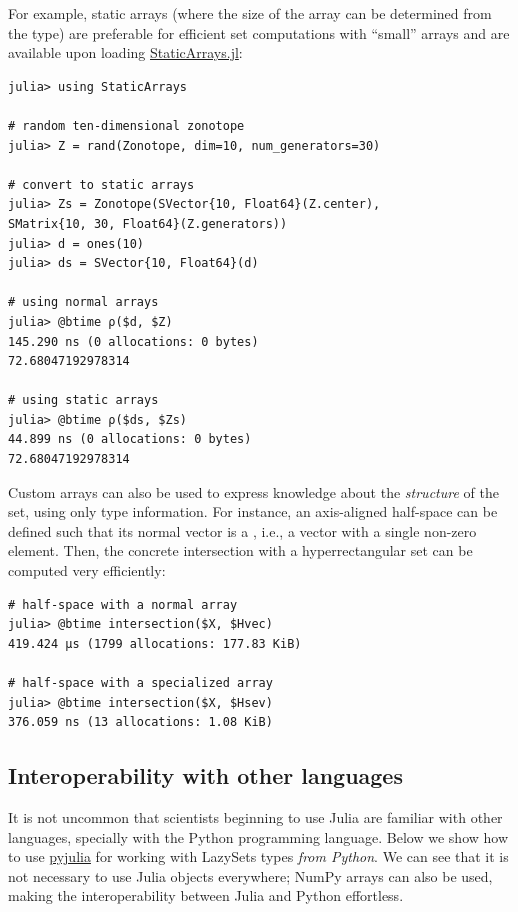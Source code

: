 \smallskip

For example, static arrays (where the size of the array can be determined from the type) are preferable for efficient set computations with ``small'' arrays and are available upon loading \href{https://github.com/JuliaArrays/StaticArrays.jl}{StaticArrays.jl}:

\begin{minipage}{\linewidth}
	\begin{lstlisting}
julia> using StaticArrays

# random ten-dimensional zonotope
julia> Z = rand(Zonotope, dim=10, num_generators=30)

# convert to static arrays
julia> Zs = Zonotope(SVector{10, Float64}(Z.center),
SMatrix{10, 30, Float64}(Z.generators))
julia> d = ones(10)
julia> ds = SVector{10, Float64}(d)

# using normal arrays
julia> @btime ρ($d, $Z)
145.290 ns (0 allocations: 0 bytes)
72.68047192978314

# using static arrays
julia> @btime ρ($ds, $Zs)
44.899 ns (0 allocations: 0 bytes)
72.68047192978314
	\end{lstlisting}
\end{minipage}

\smallskip

Custom arrays can also be used to express knowledge about the \emph{structure} of the set, using only type information. For instance, an axis-aligned half-space can be defined such that its normal vector is a , i.e., a vector with a single non-zero element.
%
Then, the concrete intersection with a hyperrectangular set can be computed very efficiently:

\begin{minipage}{\linewidth}
\begin{lstlisting}
# half-space with a normal array
julia> @btime intersection($X, $Hvec)
419.424 μs (1799 allocations: 177.83 KiB)

# half-space with a specialized array
julia> @btime intersection($X, $Hsev)
376.059 ns (13 allocations: 1.08 KiB)
\end{lstlisting}
\end{minipage}


\subsection{Interoperability with other languages}\label{sec:python}

It is not uncommon that scientists beginning to use Julia are familiar with other languages, specially with the Python programming language.
%
Below we show how to use \href{https://github.com/JuliaPy/pyjulia}{pyjulia} for working with LazySets types \emph{from Python}.
%
We can see that it is not necessary to use Julia objects everywhere; NumPy arrays can also be used, making the interoperability between Julia and Python effortless.

